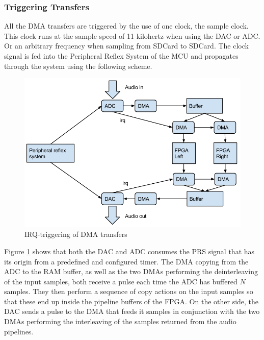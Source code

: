 \subsubsection{Triggering Transfers}

All the DMA transfers are triggered by the use of one clock, the sample clock.
This clock runs at the sample speed of 11 kilohertz when using the DAC or ADC. Or
an arbitrary frequency when sampling from SDCard to SDCard. The clock signal is fed into
the Peripheral Reflex System \cite{prs} of the MCU and propagates
through the system using the following scheme.

\begin{figure}[H]
    \centering
    \includegraphics[width=1\textwidth]{figures/sw/dma-paths.png}
    \caption{IRQ-triggering of DMA transfers}
    \label{fig:irq-triggering}
\end{figure}

Figure \ref{fig:irq-triggering} shows that both the DAC and ADC consumes the PRS signal
that has its origin from a predefined and configured timer. The
DMA copying from the ADC to the RAM buffer, as well as the two DMAs performing the
deinterleaving of the input samples, both receive a pulse each time the ADC has
buffered $N$ samples. They then perform a sequence of copy actions on the input
samples so that these end up inside the pipeline buffers of the FPGA. On the
other side, the DAC sends a pulse to the DMA that feeds it samples in conjunction
with the two DMAs performing the interleaving of the samples returned from the
audio pipelines.
